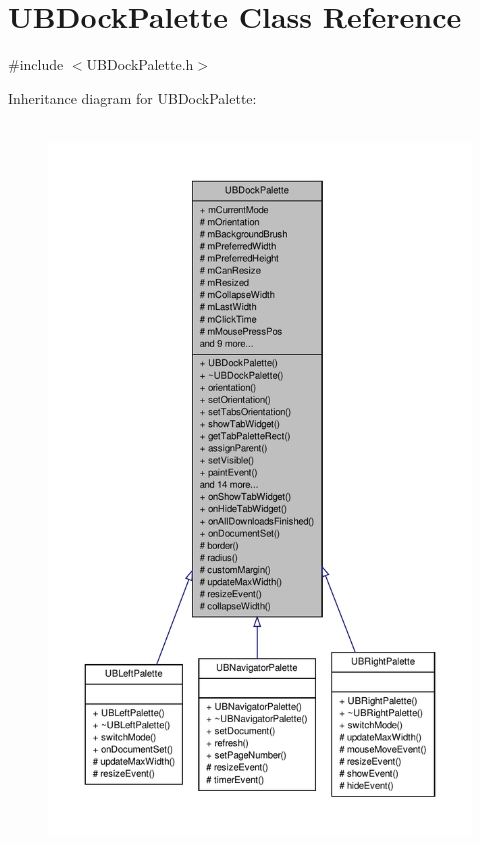 \hypertarget{class_u_b_dock_palette}{\section{U\-B\-Dock\-Palette Class Reference}
\label{dc/d54/class_u_b_dock_palette}
}


{\ttfamily \#include $<$U\-B\-Dock\-Palette.\-h$>$}



Inheritance diagram for U\-B\-Dock\-Palette\-:
\nopagebreak
\begin{figure}[H]
\begin{center}
\leavevmode
\includegraphics[height=550pt]{d0/d53/class_u_b_dock_palette__inherit__graph}
\end{center}
\end{figure}


